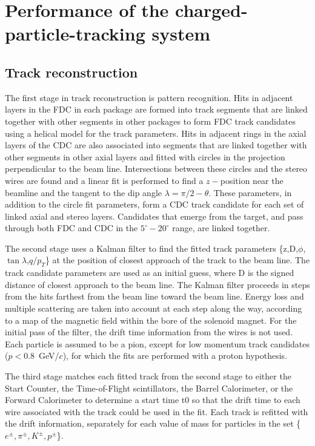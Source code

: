 \section[Performance of the charged-particle-tracking system]{Performance of the charged-particle-tracking system \label{sec:trackingperformance}}
\subsection{Track reconstruction}

The first stage in track reconstruction is pattern recognition.  Hits in adjacent
 layers in the FDC in each package are formed into track segments that are 
linked together with other segments in other packages to form FDC track 
candidates using a helical model for the track parameters.
Hits in adjacent rings in the axial layers of the CDC are also associated into 
segments that are linked together with other segments in other axial layers
and fitted with circles in the projection perpendicular to the beam line. Intersections between these circles and the stereo wires are found and a linear fit is performed to find a $z-$position near the beamline and the tangent to the dip
 angle $\lambda=\pi/2-\theta$.  These parameters, in addition to the circle fit 
parameters, form a CDC track candidate for each set of linked axial and stereo 
layers. Candidates that emerge from the target, and pass through both FDC and CDC in the  $5^\circ-20^\circ$ range, are linked together.

The second stage uses a Kalman filter \cite{KalmanFilter, KalmanFilter2} to find the fitted track parameters
\{z,D,$\phi$,$\tan\lambda$,$q/p_T$\}
at the position of closest approach of the track to the beam line. The track candidate parameters are used as an initial guess, where D is the signed distance of closest approach to the beam line.  The Kalman filter proceeds in steps from the hits farthest from the beam line toward the beam line. Energy loss and multiple scattering are taken into account at each step along the way, according to a map of the magnetic field within the bore of the solenoid magnet.
For the initial pass of the filter, the drift time information from the 
wires is not used.  Each particle is assumed to be a pion, except for low momentum track 
candidates ($p<0.8$~GeV/$c$), for which the fits are performed with a proton hypothesis.

The third stage matches each fitted track from the second stage to either
the Start Counter, the Time-of-Flight scintillators, the Barrel Calorimeter, or
the Forward Calorimeter to determine a start time t0 so that the drift time to
each wire associated with the track could be used in the fit. Each track is refitted with
the drift information, separately for each value of mass for particles in the set \{$e^\pm,\pi^\pm,K^\pm,p^\pm$\}.

